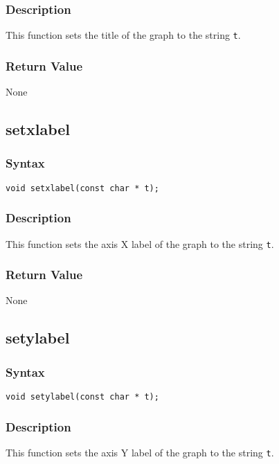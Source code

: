 \documentclass[11pt,fleqn,letterpaper]{report}
\begin{document}
\subsubsection*{Description}
This function sets the title of the graph to the string {\tt t}.

\subsubsection*{Return Value}

None

\newpage

\subsection*{setxlabel}
\subsubsection*{Syntax}
\begin{verbatim}
void setxlabel(const char * t);
\end{verbatim}
\subsubsection*{Description}
This function sets the axis X label of the graph to the string {\tt t}.

\subsubsection*{Return Value}

None

\newpage

\subsection*{setylabel}
\subsubsection*{Syntax}
\begin{verbatim}
void setylabel(const char * t);
\end{verbatim}
\subsubsection*{Description}
This function sets the axis Y label of the graph to the string {\tt t}.
\end{document}
